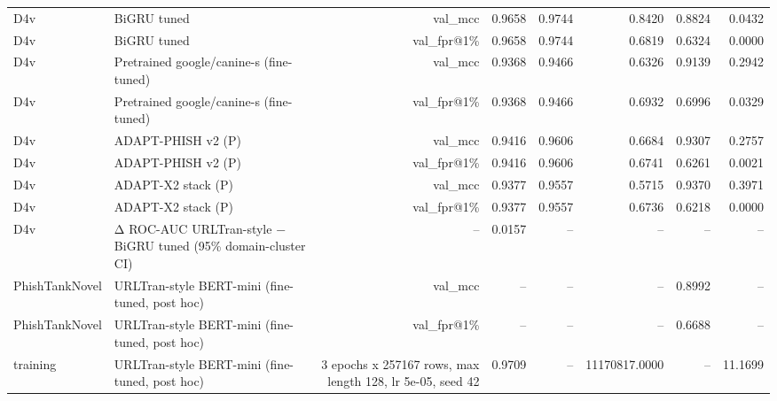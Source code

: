 \begin{table}[t]
\begin{tabular}{llrrrrrr}
D4v & BiGRU tuned & val\_mcc & 0.9658 & 0.9744 & 0.8420 & 0.8824 & 0.0432 \\
D4v & BiGRU tuned & val\_fpr@1\% & 0.9658 & 0.9744 & 0.6819 & 0.6324 & 0.0000 \\
D4v & Pretrained google/canine-s (fine-tuned) & val\_mcc & 0.9368 & 0.9466 & 0.6326 & 0.9139 & 0.2942 \\
D4v & Pretrained google/canine-s (fine-tuned) & val\_fpr@1\% & 0.9368 & 0.9466 & 0.6932 & 0.6996 & 0.0329 \\
D4v & ADAPT-PHISH v2 (P) & val\_mcc & 0.9416 & 0.9606 & 0.6684 & 0.9307 & 0.2757 \\
D4v & ADAPT-PHISH v2 (P) & val\_fpr@1\% & 0.9416 & 0.9606 & 0.6741 & 0.6261 & 0.0021 \\
D4v & ADAPT-X2 stack (P) & val\_mcc & 0.9377 & 0.9557 & 0.5715 & 0.9370 & 0.3971 \\
D4v & ADAPT-X2 stack (P) & val\_fpr@1\% & 0.9377 & 0.9557 & 0.6736 & 0.6218 & 0.0000 \\
D4v & Δ ROC-AUC URLTran-style − BiGRU tuned (95\% domain-cluster CI) & -- & 0.0157 & -- & -- & -- & -- \\
PhishTankNovel & URLTran-style BERT-mini (fine-tuned, post hoc) & val\_mcc & -- & -- & -- & 0.8992 & -- \\
PhishTankNovel & URLTran-style BERT-mini (fine-tuned, post hoc) & val\_fpr@1\% & -- & -- & -- & 0.6688 & -- \\
training & URLTran-style BERT-mini (fine-tuned, post hoc) & 3 epochs x 257167 rows, max length 128, lr 5e-05, seed 42 & 0.9709 & -- & 11170817.0000 & -- & 11.1699 \\
\bottomrule
\end{tabular}
\end{table}